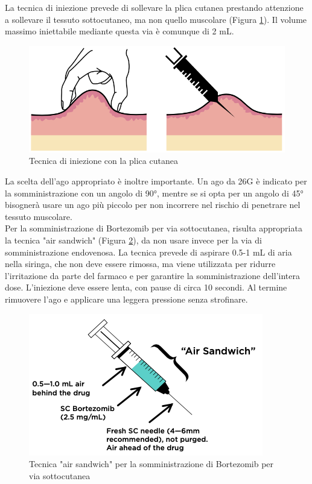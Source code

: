 La tecnica di iniezione prevede di sollevare la plica cutanea prestando attenzione a sollevare il tessuto 
sottocutaneo, ma non quello muscolare (Figura \ref{fig:FIGURE_3.6}). 
Il volume massimo iniettabile mediante questa via è comunque di 2 mL.

\begin{figure}[H]
    \begin{center}
    \includegraphics[width=0.5\columnwidth]{img/PLICA.png}
    \vspace{-3mm}
    \end{center}
    \caption{ Tecnica di iniezione con la plica cutanea
    \cite{BORTEZOMIB}}
    \label{fig:FIGURE_3.6}
\end{figure}

La scelta dell’ago appropriato è inoltre importante. Un ago da 26G è indicato per la somministrazione con un angolo di
90°, mentre se si opta per un angolo di 45° bisognerà usare un ago più piccolo per non incorrere nel rischio di 
penetrare nel tessuto muscolare\cite{BORTNURSES}.\\
Per la somministrazione di Bortezomib per via sottocutanea, risulta appropriata la tecnica "air sandwich" 
(Figura \ref{fig:FIGURE_3.7}),
da non usare invece per la via di somministrazione endovenosa. La tecnica prevede di aspirare 0.5-1 mL 
di aria nella siringa, che non deve essere rimossa, ma viene utilizzata per ridurre l'irritazione da parte del farmaco e 
per garantire la somministrazione dell'intera dose. L'iniezione deve essere lenta, con pause di circa 10 secondi. 
Al termine rimuovere l'ago e applicare una leggera pressione senza strofinare\cite{BORTNURSES}.

\begin{figure}[H]
    \begin{center}
    \includegraphics[width=0.5\columnwidth]{img/SIRINGA.png}
    \vspace{-3mm}
    \end{center}
    \caption{ Tecnica "air sandwich" per la somministrazione di Bortezomib per via sottocutanea
    \cite{BORTEZOMIB}}
    \label{fig:FIGURE_3.7}
\end{figure}

